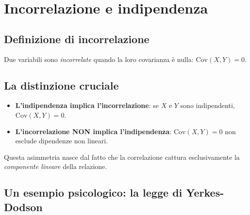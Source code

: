 \documentclass[
  italian,
  letterpaper,
  a4paper,
  11pt,
  open=any]{scrbook}
\providecommand{\tightlist}{%
  \setlength{\itemsep}{0pt}\setlength{\parskip}{0pt}}
\theoremstyle{plain}
\theoremstyle{definition}
\theoremstyle{definition}
\theoremstyle{remark}
\begin{document}
\section{Incorrelazione e
indipendenza}\label{sec-uncorrelated-vs-independent}

\subsection{Definizione di
incorrelazione}\label{definizione-di-incorrelazione}

Due variabili sono \emph{incorrelate} quando la loro covarianza è nulla:
\(\text{Cov}(X, Y) = 0\).

\subsection{La distinzione cruciale}\label{la-distinzione-cruciale}

\begin{tcolorbox}[enhanced jigsaw, arc=.35mm, bottomrule=.15mm, bottomtitle=1mm, breakable, colback=white, colbacktitle=quarto-callout-important-color!10!white, colframe=quarto-callout-important-color-frame, coltitle=black, left=2mm, leftrule=.75mm, opacityback=0, opacitybacktitle=0.6, rightrule=.15mm, title=\textcolor{quarto-callout-important-color}{\faExclamation}\hspace{0.5em}{Relazione asimmetrica}, titlerule=0mm, toprule=.15mm, toptitle=1mm]

\begin{itemize}
\tightlist
\item
  \textbf{L'indipendenza implica l'incorrelazione}: se \(X\) e \(Y\)
  sono indipendenti, \(\text{Cov}(X,Y) = 0\).
\item
  \textbf{L'incorrelazione NON implica l'indipendenza}:
  \(\text{Cov}(X,Y) = 0\) non esclude dipendenze non lineari.
\end{itemize}

\end{tcolorbox}

Questa asimmetria nasce dal fatto che la correlazione cattura
esclusivamente la \emph{componente lineare} della relazione.

\subsection{Un esempio psicologico: la legge di
Yerkes-Dodson}\label{un-esempio-psicologico-la-legge-di-yerkes-dodson}
\end{document}
